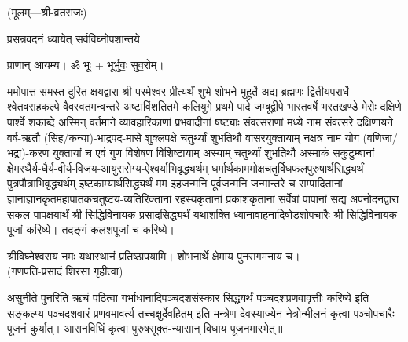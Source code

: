 
\centerline{\small{(मूलम्—श्री-व्रतराजः)}}




{प्रसन्नवदनं ध्यायेत् सर्वविघ्नोपशान्तये}

प्राणान् आयम्य। ॐ भूः + भूर्भुवः॒ सुव॒रोम्।


ममोपात्त-समस्त-दुरित-क्षयद्वारा श्री-परमेश्वर-प्रीत्यर्थं शुभे शोभने मुहूर्ते अद्य ब्रह्मणः
द्वितीयपरार्धे श्वेतवराहकल्पे वैवस्वतमन्वन्तरे अष्टाविंशतितमे कलियुगे प्रथमे पादे
जम्बूद्वीपे भारतवर्षे भरतखण्डे मेरोः दक्षिणे पार्श्वे शकाब्दे अस्मिन् वर्तमाने व्यावहारिकाणां
प्रभवादीनां षष्ट्याः संवत्सराणां मध्ये \blank{} नाम संवत्सरे दक्षिणायने
वर्ष-ऋतौ (सिंह/कन्या)-भाद्रपद-मासे शुक्लपक्षे चतुर्थ्यां शुभतिथौ \blank{} वासरयुक्तायाम्
\blank{} नक्षत्र \blank{} नाम योग
(वणिजा/भद्रा)-करण युक्तायां च एवं गुण विशेषण विशिष्टायाम्
अस्याम् चतुर्थ्यां शुभतिथौ
अस्माकं सकुटुम्बानां क्षेमस्थैर्य-धैर्य-वीर्य-विजय-आयुरारोग्य-ऐश्वर्याभिवृद्ध्यर्थम्
धर्मार्थकाममोक्ष\-चतुर्विधफलपुरुषार्थसिद्ध्यर्थं पुत्रपौत्राभि\-वृद्ध्यर्थम् इष्टकाम्यार्थसिद्ध्यर्थं
मम इहजन्मनि पूर्वजन्मनि जन्मान्तरे च सम्पादितानां ज्ञानाज्ञानकृतमहा\-पातकचतुष्टय-व्यतिरिक्तानां
रहस्यकृतानां प्रकाशकृतानां सर्वेषां पापानां सद्य अपनोदनद्वारा
सकल-पापक्षयार्थं श्री-सिद्धिविनायक-प्रसादसिद्ध्यर्थं
यथाशक्ति-ध्यानावाहनादिषोडशोपचारैः श्री-सिद्धिविनायक-पूजां करिष्ये। तदङ्गं कलशपूजां च करिष्ये।

श्रीविघ्नेश्वराय नमः यथास्थानं प्रतिष्ठापयामि। शोभनार्थे क्षेमाय पुनरागमनाय च।\\
(गणपति-प्रसादं शिरसा गृहीत्वा)














असुनीते पुनरिति ऋचं पठित्वा गर्भाधानादिपञ्चदशसंस्कार सिद्धयर्थं पञ्चदशप्रणवावृत्तीः करिष्ये इति सङ्कल्प्य पञ्चदशवारं प्रणवमावर्त्य तच्चक्षुर्देवहितम् इति मन्त्रेण देवस्याज्येन नेत्रोन्मीलनं कृत्वा पञ्चोपचारैः पूजनं कुर्यात्।
आसनविधिं कृत्वा पुरुषसूक्त-न्यासान् विधाय पूजनमारभेत्॥


